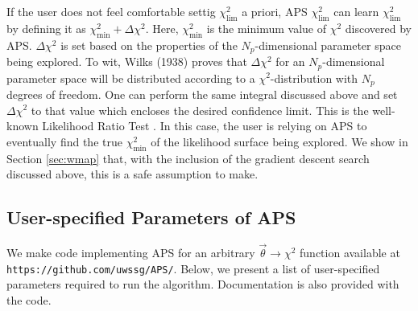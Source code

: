 \documentclass[useAMS,usenatbib]{aastex}
\begin{document}
If the user does not feel comfortable settig $\chi^2_\text{lim}$
a priori, APS $\chi^2_\text{lim}$ can learn $\chi^2_\text{lim}$ by
defining it as $\chi^2_\text{min}+\Delta\chi^2$.  Here, $\chi^2_\text{min}$
is the minimum value of $\chi^2$ discovered by APS.  $\Delta \chi^2$ is set
based on the properties of the $N_p$-dimensional parameter space being explored.
To wit, Wilks (1938) proves that $\Delta\chi^2$ for an $N_p$-dimensional
parameter space will be distributed according to a $\chi^2$-distribution
with $N_p$ degrees of freedom.  One can perform the same integral discussed
above and set $\Delta\chi^2$ to that value which encloses the desired confidence
limit.  This is the well-known Likelihood Ratio Test \cite{np}.
In this case, the user is relying on APS to eventually find the true
$\chi^2_\text{min}$ of the likelihood surface being explored.  We show in
Section \ref{sec:wmap} that, with the inclusion of the gradient descent search
discussed above, this is a safe assumption to make.

\subsection{User-specified Parameters of APS}
\label{sec:user}

We make code implementing APS for an arbitrary $\vec{\theta}\rightarrow\chi^2$
function available at \verb|https://github.com/uwssg/APS/|.  
Below, we present a list of user-specified parameters 
required to run the algorithm.  Documentation is also provided with
the code.
\end{document}
